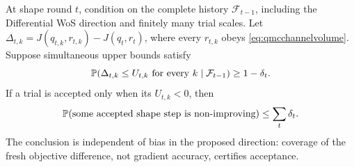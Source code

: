 \begin{proposition}
\label{prop:fresh-shape}
At shape round $t$, condition on the complete history $\mathcal F_{t-1}$,
including the Differential WoS direction and finitely many trial scales.  Let
$\Delta_{t,k}=J(q_{t,k},r_{t,k})-J(q_t,r_t)$, where every $r_{t,k}$ obeys
\cref{eq:qmcchannelvolume}.  Suppose simultaneous upper bounds satisfy
\begin{equation}
 \mathbb{P}\!\left(\Delta_{t,k}\le U_{t,k}\ \text{for every }k
 \mid\mathcal F_{t-1}\right)\ge1-\delta_t.
 \label{eq:shapesimultaneouscoverage}
\end{equation}
If a trial is accepted only when its $U_{t,k}<0$, then
\begin{equation}
 \mathbb{P}(\text{some accepted shape step is non-improving})
 \le\sum_t\delta_t.
 \label{eq:shapefamilywise}
\end{equation}
The conclusion is independent of bias in the proposed direction: coverage of
the fresh objective difference, not gradient accuracy, certifies acceptance.
\end{proposition}

